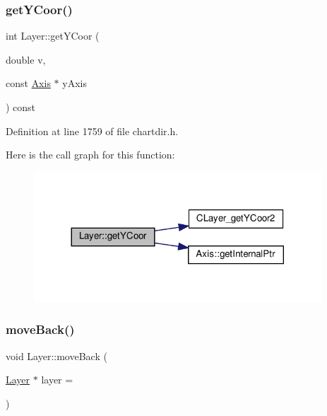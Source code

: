 \subsubsection{\texorpdfstring{get\+Y\+Coor()}{getYCoor()}\hspace{0.1cm}{\footnotesize\ttfamily [2/2]}}
{\footnotesize\ttfamily int Layer\+::get\+Y\+Coor (\begin{DoxyParamCaption}\item[{double}]{v,  }\item[{const \hyperlink{class_axis}{Axis} $\ast$}]{y\+Axis }\end{DoxyParamCaption}) const\hspace{0.3cm}{\ttfamily [inline]}}



Definition at line 1759 of file chartdir.\+h.

Here is the call graph for this function\+:
\nopagebreak
\begin{figure}[H]
\begin{center}
\leavevmode
\includegraphics[width=305pt]{class_layer_aee258204d7c1ac071d71664025e48bc0_cgraph}
\end{center}
\end{figure}
\mbox{\label{class_layer_a20e9919153e863772cdbe88bcc8cf0ea}} 
\subsubsection{\texorpdfstring{move\+Back()}{moveBack()}}
{\footnotesize\ttfamily void Layer\+::move\+Back (\begin{DoxyParamCaption}\item[{\hyperlink{class_layer}{Layer} $\ast$}]{layer = {} }\end{DoxyParamCaption})\hspace{0.3cm}{\ttfamily [inline]}}



